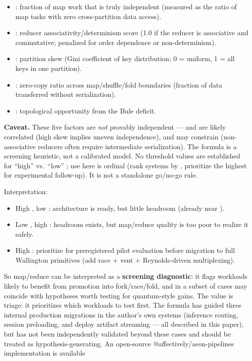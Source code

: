 \documentclass[
]{article}
\providecommand{\tightlist}{%
  \setlength{\itemsep}{0pt}\setlength{\parskip}{0pt}}
\begin{document}
\begin{itemize}
\tightlist
\item
  : fraction of map work that is truly independent (measured as the
  ratio of map tasks with zero cross-partition data access).\\
\item
  : reducer associativity/determinism score (1.0 if the reducer is
  associative and commutative; penalized for order dependence or
  non-determinism).\\
\item
  : partition skew (Gini coefficient of key distribution; 0 = uniform, 1
  = all keys in one partition).\\
\item
  : zero-copy ratio across map/shuffle/fold boundaries (fraction of data
  transferred without serialization).\\
\item
  : topological opportunity from the Bule deficit.
\end{itemize}

\textbf{Caveat.} These five factors are \emph{not} provably independent
--- and are likely correlated (high skew implies uneven independence),
and may constrain (non-associative reducers often require intermediate
serialization). The formula is a screening heuristic, not a calibrated
model. No threshold values are established for ``high'' vs.~``low'' ;
use here is ordinal (rank systems by , prioritize the highest for
experimental follow-up). It is not a standalone go/no-go rule.

Interpretation:

\begin{itemize}
\tightlist
\item
  High , low : architecture is ready, but little headroom (already near
  ).\\
\item
  Low , high : headroom exists, but map/reduce quality is too poor to
  realize it safely.\\
\item
  High : prioritize for preregistered pilot evaluation before migration
  to full Wallington primitives (add race + vent + Reynolds-driven
  multiplexing).
\end{itemize}

So map/reduce can be interpreted as a \textbf{screening diagnostic}: it
flags workloads likely to benefit from promotion into fork/race/fold,
and in a subset of cases may coincide with hypotheses worth testing for
quantum-style gains. The value is triage: it prioritizes which workloads
to test first. The formula has guided three internal production
migrations in the author's own systems (inference routing, session
preloading, and deploy artifact streaming --- all described in this
paper), but has not been independently validated beyond these cases and
should be treated as hypothesis-generating. An open-source
@affectively/aeon-pipelines implementation is available
\end{document}
